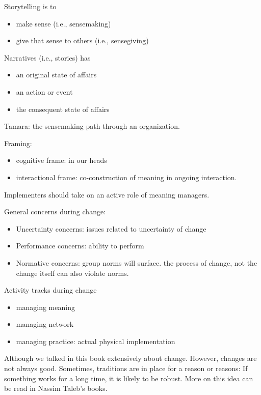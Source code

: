 \documentclass[
]{book}
\providecommand{\tightlist}{%
  \setlength{\itemsep}{0pt}\setlength{\parskip}{0pt}}
\begin{document}
Storytelling is to

\begin{itemize}
\tightlist
\item
  make sense (i.e., sensemaking)
\item
  give that sense to others (i.e., sensegiving)
\end{itemize}

Narratives (i.e., stories) \citep{czarniawska1998a} has

\begin{itemize}
\tightlist
\item
  an original state of affairs
\item
  an action or event
\item
  the consequent state of affairs
\end{itemize}

Tamara: the sensemaking path through an organization. \citep{David_2008}

Framing:

\begin{itemize}
\tightlist
\item
  cognitive frame: in our heads
\item
  interactional frame: co-construction of meaning in ongoing interaction.
\end{itemize}

Implementers should take on an active role of meaning managers.

General concerns during change:

\begin{itemize}
\tightlist
\item
  Uncertainty concerns: issues related to uncertainty of change
\item
  Performance concerns: ability to perform
\item
  Normative concerns: group norms will surface. the process of change, not the change itself can also violate norms.
\end{itemize}

Activity tracks during change

\begin{itemize}
\tightlist
\item
  managing meaning
\item
  managing network
\item
  managing practice: actual physical implementation
\end{itemize}

Although we talked in this book extensively about change. However, changes are not always good. Sometimes, traditions
are in place for a reason or reasons: If something works for a long time, it is likely to be robust. More on this idea
can be read in Nassim Taleb's books.

\hypertarget{appendix-appendix}{%
\appendix}


  
\end{document}

